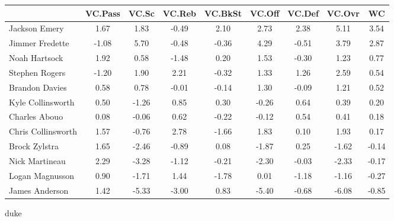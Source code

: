 \documentclass[10pt,letterpaper]{article}
\begin{document}
\begin{table}[ht]
\begin{center}
\begin{tabular}{lcccccccc}
  \hline
 & VC.Pass & VC.Sc & VC.Reb & VC.BkSt & VC.Off & VC.Def & VC.Ovr & WC \\ 
  \hline
Jackson Emery & 1.67 & 1.83 & -0.49 & 2.10 & 2.73 & 2.38 & 5.11 & 3.54 \\ 
  Jimmer Fredette & -1.08 & 5.70 & -0.48 & -0.36 & 4.29 & -0.51 & 3.79 & 2.87 \\ 
  Noah Hartsock & 1.92 & 0.58 & -1.48 & 0.20 & 1.53 & -0.30 & 1.23 & 0.77 \\ 
  Stephen Rogers & -1.20 & 1.90 & 2.21 & -0.32 & 1.33 & 1.26 & 2.59 & 0.54 \\ 
  Brandon Davies & 0.58 & 0.78 & -0.01 & -0.14 & 1.30 & -0.09 & 1.21 & 0.52 \\ 
  Kyle Collinsworth & 0.50 & -1.26 & 0.85 & 0.30 & -0.26 & 0.64 & 0.39 & 0.20 \\ 
  Charles Abouo & 0.08 & -0.06 & 0.62 & -0.22 & -0.12 & 0.54 & 0.41 & 0.18 \\ 
  Chris Collinsworth & 1.57 & -0.76 & 2.78 & -1.66 & 1.83 & 0.10 & 1.93 & 0.17 \\ 
  Brock Zylstra & 1.65 & -2.46 & -0.89 & 0.08 & -1.87 & 0.25 & -1.62 & -0.14 \\ 
  Nick Martineau & 2.29 & -3.28 & -1.12 & -0.21 & -2.30 & -0.03 & -2.33 & -0.17 \\ 
  Logan Magnusson & 0.90 & -1.71 & 1.44 & -1.78 & 0.01 & -1.18 & -1.16 & -0.27 \\ 
  James Anderson & 1.42 & -5.33 & -3.00 & 0.83 & -5.40 & -0.68 & -6.08 & -0.85 \\ 
   \hline
\end{tabular}
\end{center}
\end{table}
\newpage
\begin{center}
duke 
\end{center}
\end{document}
